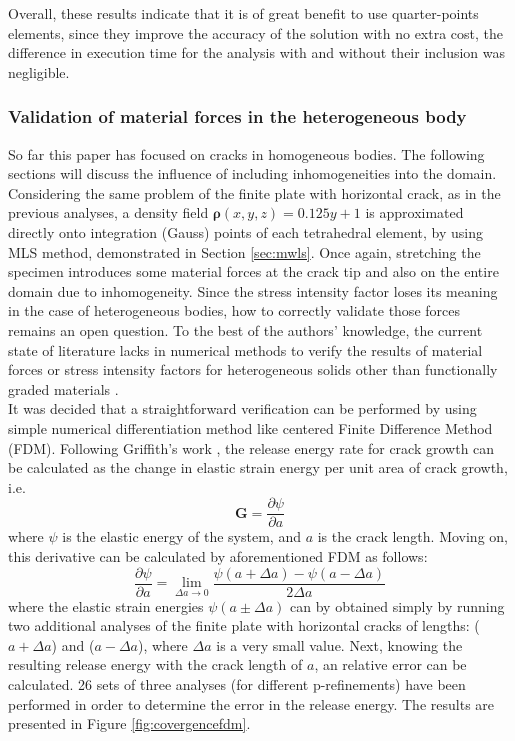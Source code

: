 \documentclass[11pt]{acmeArticle}
\numberwithin{equation}{section}
\begin{document}
Overall, these results indicate that it is of great benefit to use quarter-points elements, since they improve the accuracy of the solution with no extra cost, the difference in execution time for the analysis with and without their inclusion was negligible. 
\subsubsection{Validation of material forces in the heterogeneous body}
So far this paper has focused on cracks in homogeneous bodies. The following sections will discuss the influence of including inhomogeneities into the domain. Considering the same problem of the finite plate with horizontal crack, as in the previous analyses, a density field $\mathbf{\rho}(x,y,z) = 0.125y + 1$ is approximated directly onto integration (Gauss) points of each tetrahedral element, by using MLS method, demonstrated in Section \ref{sec:mwls}. Once again, stretching the specimen introduces some material forces at the crack tip and also on the entire domain due to inhomogeneity. Since the stress intensity factor loses its meaning in the case of heterogeneous bodies, how to correctly validate those forces remains an open question. To the best of the authors' knowledge, the current state of literature lacks in numerical methods to verify the results of material forces or stress intensity factors for heterogeneous solids other than functionally graded materials \citep{kim2002finite}. \\
It was decided that a straightforward verification can be performed by using simple numerical differentiation method like centered Finite Difference Method (FDM). Following Griffith's work \citep{Griffith163}, the release energy rate for crack growth can be calculated as the change in elastic strain energy per unit area of crack growth, i.e.
\begin{equation}
\mathbf G = \frac{\partial \psi}{\partial a}
\end{equation}
where $\psi$ is the elastic energy of the system, and $a$ is the crack length. Moving on, this derivative can be calculated by aforementioned FDM as follows:
\begin{equation}
 \frac{\partial \psi}{\partial a} = \lim_{\Delta a \to 0} \frac{\psi(a + \Delta a) - \psi(a -\Delta a)}{2\Delta a}
\end{equation}
where the elastic strain energies $\psi(a \pm \Delta a)$ can by obtained simply by running two additional analyses of the finite plate with horizontal cracks of lengths: ($a + \Delta a$) and ($a - \Delta a$), where $\Delta a$ is a very small value. Next, knowing the resulting release energy with the crack length of $a$, an relative error can be calculated. 26 sets of three analyses (for different p-refinements) have been performed in order to determine the error in the release energy. The results are presented in Figure \ref{fig:covergencefdm}.
\end{document}
